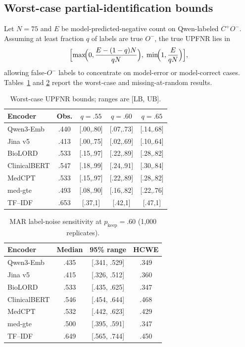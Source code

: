 \documentclass[11pt]{article}
\begin{document}
\subsection{Worst-case partial-identification bounds}
Let $N=75$ and $E$ be model-predicted-negative count on Qwen-labeled $C^+O^-$.
Assuming at least fraction $q$ of labels are true $O^-$, the true UPFNR lies in
\[
  \Bigl[\max\!\Bigl(0,\frac{E-(1-q)N}{qN}\Bigr),\;
        \min\!\Bigl(1,\frac{E}{qN}\Bigr)\Bigr],
\]
allowing false-$O^-$ labels to concentrate on model-error or model-correct
cases. Tables~\ref{tab:label_noise_bounds} and \ref{tab:label_noise_mar}
report the worst-case and missing-at-random results.

\begin{table}[!htbp]
  \centering
  \scriptsize
  \renewcommand{\arraystretch}{1.05}
  \caption{Worst-case UPFNR bounds; ranges are [LB, UB].}
  \label{tab:label_noise_bounds}
  \begin{tabular*}{\columnwidth}{@{\extracolsep{\fill}}lcccc@{}}
    \toprule
    \textbf{Encoder} & \textbf{Obs.} & \textbf{$q=.55$} &
    \textbf{$q=.60$} & \textbf{$q=.65$} \\
    \midrule
    Qwen3-Emb    & .440 & [.00,.80] & [.07,.73] & [.14,.68] \\
    Jina v5      & .413 & [.00,.75] & [.02,.69] & [.10,.64] \\
    BioLORD      & .533 & [.15,.97] & [.22,.89] & [.28,.82] \\
    ClinicalBERT & .547 & [.18,.99] & [.24,.91] & [.30,.84] \\
    MedCPT       & .533 & [.15,.97] & [.22,.89] & [.28,.82] \\
    med-gte      & .493 & [.08,.90] & [.16,.82] & [.22,.76] \\
    TF--IDF      & .653 & [.37,1] & [.42,1] & [.47,1] \\
    \bottomrule
  \end{tabular*}
\end{table}

\begin{table}[!htbp]
  \centering
  \footnotesize
  \renewcommand{\arraystretch}{1.08}
  \caption{MAR label-noise sensitivity at $p_{\mathrm{keep}}=.60$
  (1,000 replicates).}
  \label{tab:label_noise_mar}
  \begin{tabular*}{\columnwidth}{@{\extracolsep{\fill}}lccc@{}}
    \toprule
    \textbf{Encoder} & \textbf{Median} & \textbf{95\% range} &
    \textbf{HCWE} \\
    \midrule
    Qwen3-Emb    & .435 & [.341, .529] & .349 \\
    Jina v5      & .415 & [.326, .512] & .360 \\
    BioLORD      & .533 & [.435, .625] & .347 \\
    ClinicalBERT & .546 & [.454, .644] & .468 \\
    MedCPT       & .532 & [.442, .623] & .429 \\
    med-gte      & .500 & [.395, .591] & .347 \\
    TF--IDF      & .649 & [.565, .744] & .450 \\
    \bottomrule
  \end{tabular*}
\end{table}
\end{document}
